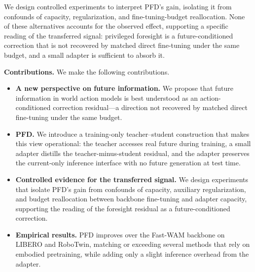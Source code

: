 \documentclass{article}
\begin{document}
We design controlled experiments to interpret PFD's gain, isolating it from confounds of capacity, regularization, and fine-tuning-budget reallocation. None of these alternatives accounts for the observed effect, supporting a specific reading of the transferred signal: privileged foresight is a future-conditioned correction that is not recovered by matched direct fine-tuning under the same budget, and a small adapter is sufficient to absorb it.

\noindent\textbf{Contributions.} We make the following contributions.
\begin{itemize}
\item \textbf{A new perspective on future information.} We propose that future information in world action models is best understood as an action-conditioned correction residual---a direction not recovered by matched direct fine-tuning under the same budget.
\item \textbf{PFD.} We introduce a training-only teacher--student construction that makes this view operational: the teacher accesses real future during training, a small adapter distills the teacher-minus-student residual, and the adapter preserves the current-only inference interface with no future generation at test time.
\item \textbf{Controlled evidence for the transferred signal.} We design experiments that isolate PFD's gain from confounds of capacity, auxiliary regularization, and budget reallocation between backbone fine-tuning and adapter capacity, supporting the reading of the foresight residual as a future-conditioned correction.
\item \textbf{Empirical results.} PFD improves over the Fast-WAM backbone on LIBERO and RoboTwin, matching or exceeding several methods that rely on embodied pretraining, while adding only a slight inference overhead from the adapter.
\end{itemize}


\end{document}
